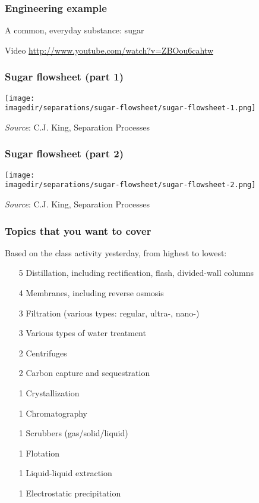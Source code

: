 \begin{frame}\frametitle{Engineering example}
	A common, everyday substance: sugar 

	\vspace{36pt}
	Video \href{http://www.youtube.com/watch?v=ZBOou6cahtw}{http://www.youtube.com/watch?v=ZBOou6cahtw}
\end{frame}

\begin{frame}\frametitle{Sugar flowsheet (part 1)}
	\begin{center}
		\texttt{[image: \\imagedir/separations/sugar-flowsheet/sugar-flowsheet-1.png]}
	\end{center}
	\emph{Source}: C.J. King, Separation Processes
\end{frame}

\begin{frame}\frametitle{Sugar flowsheet (part 2)}
	\begin{center}
		\texttt{[image: \\imagedir/separations/sugar-flowsheet/sugar-flowsheet-2.png]}
	\end{center}
	\emph{Source}: C.J. King, Separation Processes
\end{frame}

\begin{frame}\frametitle{Topics that you want to cover}
	Based on the class activity yesterday, from highest to lowest:
	\begin{itemize}
		\item	[5] Distillation, including rectification, flash, divided-wall columns
		\item   [4] Membranes, including reverse osmosis
		\item	[3] Filtration (various types: regular, ultra-, nano-)
		\item	[3] Various types of water treatment
		\item	[2] Centrifuges
		\item	[2] Carbon capture and sequestration
		\item	[1] Crystallization
		\item	[1] Chromatography
		\item	[1] Scrubbers (gas/solid/liquid)
		\item	[1] Flotation
		\item	[1] Liquid-liquid extraction
		\item	[1] Electrostatic precipitation
	\end{itemize}
\end{frame}

